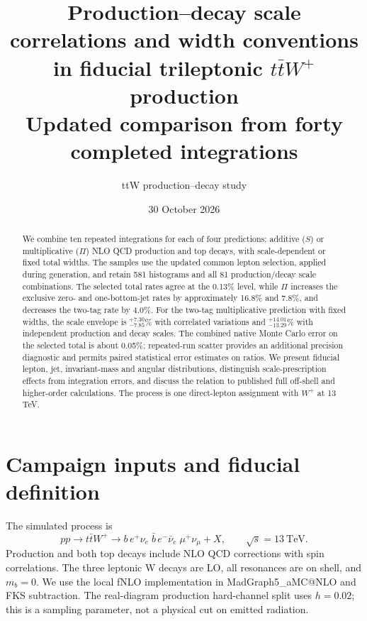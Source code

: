 \documentclass[11pt,a4paper]{article}
\title{Production--decay scale correlations and width conventions\\
in fiducial trileptonic $t\bar tW^+$ production\\
\large Updated comparison from forty completed integrations}
\author{ttW production--decay study}
\date{30 October 2026}
\begin{document}
\maketitle
\begin{abstract}
We combine ten repeated integrations for each of four predictions:
additive ($S$) or multiplicative ($\Pi$) NLO QCD production and top decays,
with scale-dependent or fixed total widths. The samples use the updated
common lepton selection, applied during generation, and retain 581
histograms and all 81 production/decay scale combinations. The selected
total rates agree at the 0.13\% level, while $\Pi$ increases the exclusive
zero- and one-bottom-jet rates by approximately 16.8\% and 7.8\%, and
decreases the two-tag rate by 4.0\%. For the two-tag multiplicative
prediction with fixed widths, the scale envelope is
${}^{+7.30}_{-7.85}$\% with correlated variations and
${}^{+14.01}_{-13.29}$\% with independent production and decay scales.
The combined native Monte Carlo error on the selected total is about
0.05\%; repeated-run scatter provides an additional precision diagnostic
and permits paired statistical error estimates on ratios. We present
fiducial lepton, jet, invariant-mass and angular distributions, distinguish
scale-prescription effects from integration errors, and discuss the
relation to published full off-shell and higher-order calculations.
The process is one direct-lepton assignment with $W^+$ at 13 TeV.
\end{abstract}

\section{Campaign inputs and fiducial definition}
The simulated process is
\begin{equation}
 pp\to t\bar tW^+\to
 b\,e^+\nu_e\;\bar b\,e^-\bar\nu_e\;\mu^+\nu_\mu+X,
 \qquad \sqrt{s}=13~\mathrm{TeV}.
\end{equation}
Production and both top decays include NLO QCD corrections with spin
correlations. The three leptonic W decays are LO, all resonances are on
shell, and $m_b=0$. We use the local fNLO implementation in
MadGraph5\_aMC@NLO and FKS subtraction\cite{MG5,MadFKS}.
The real-diagram production hard-channel split uses $h=0.02$; this is a
sampling parameter, not a physical cut on emitted radiation.
\end{document}
